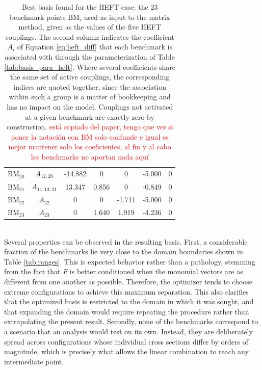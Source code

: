 \begin{table}
\begin{tabular}{l|c|c|c|c|c|c}
      $\mathrm{BM}_{20}$ & $A_{12,20}$    & -14.882 & 0      & 0      & -5.000 & 0 \\
      $\mathrm{BM}_{21}$ & $A_{11,13,21}$ & 13.347  & 0.856  & 0      & -0.849 & 0 \\
      $\mathrm{BM}_{22}$ & $A_{22}$       & 0       & 0      & -1.711 & -5.000 & 0 \\
      $\mathrm{BM}_{23}$ & $A_{23}$       & 0       & 1.640  & 1.919  & -4.236 & 0 \\
    \end{tabular}
    \caption{Best basis found for the HEFT case: the 23 benchmark points $\mathrm{BM}_i$
    used as input to the matrix method, given as the values of the five HEFT couplings.
    The second column indicates the coefficient $A_i$ of Equation \ref{eq:heft_diff} that each benchmark is associated with through the parameterization of Table \ref{tab:basis_para_heft}. Where several coefficients share the same set of
    active couplings, the corresponding indices are quoted together, since the association within such a group is a matter of bookkeeping and has no impact on the model. Couplings not activated at a given benchmark are exactly zero by construction. \textcolor{red}{está copiado del paper, tengo que ver si poner la notación con BM solo confunde e igual es mejor mantener solo los coeficientes, al fin y al cabo los benchmarks no aportan nada aquí}}
    \label{tab:bestheft}
\end{table}


%
\\
Several properties can be observed in the resulting basis. First, a considerable fraction of the benchmarks lie very close to the domain boundaries shown in Table \ref{tab:ranges}. This is expected behavior rather than a pathology, stemming from the fact that $F$ is better conditioned when the monomial vectors are as different from one another as possible. Therefore, the optimizer tends to choose extreme configurations to achieve this maximum separation. This also clarifies that the optimized basis is restricted to the domain in which it was sought, and that expanding the domain would require repeating the procedure rather than extrapolating the present result. Secondly, none of the benchmarks correspond to a scenario that an analysis would test on its own. Instead, they are deliberately spread across configurations whose individual cross sections differ by orders of magnitude, which is precisely what allows the linear combination to reach any intermediate point.

